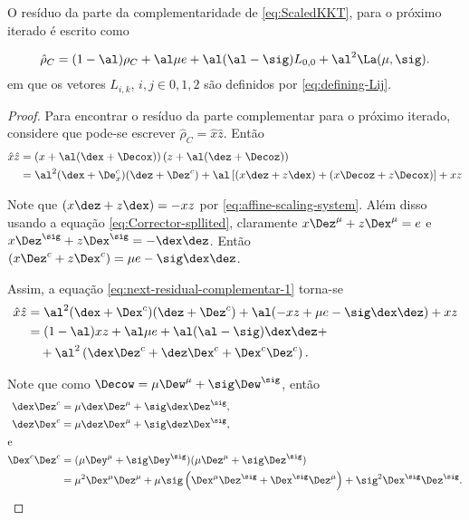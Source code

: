  
\begin{lema}\label{lemma:nonlinear-residual}
O resíduo da parte da complementaridade de  \eqref{eq:ScaledKKT}, para o próximo iterado é
escrito como

\begin{equation}
\label{eq:next-residual-complementar}
\hat{\rho}_C = (1-\al)\rho_C + \al\mu e+ \al(\al-\sig)L_{0,0} +
\al^2\La(\mu,\sig).
\end{equation}
em que os vetores $L_{i,k}$, $i,j \in {0,1,2}$ são definidos por
\eqref{eq:defining-Lij}.
\end{lema}

\begin{proof} 
Para encontrar o resíduo da parte complementar para o próximo iterado,
considere que pode-se escrever
 $\hat{\rho}_C  =
\hat{x}\hat{z}$. Então
\begin{align}
\hat{x}\hat{z} & = \left(x + \al(\dex + \Decox) \right)\left( z + \al(\dez + \Decoz
)\right) \notag \\
& = \al^2(\dex+\De^c_x)(\dez + \Dez^c) +  \al\left[  (x\dez+z\dex) +
(x\Decoz + z\Decox)\right] + xz \label{eq:next-residual-complementar-1}
\end{align}


Note que  $ (x\dez+z\dex) = -xz$ por \eqref{eq:affine-scaling-system}. Além
disso usando a equação \eqref{eq:Corrector-spllited}, claramente  $x\Dez^\mu +
z\Dex^\mu = e$ e $x\Dez^\sig + z\Dex^\sig = - \dex\dez$. Então $(x\Dez^c +
z\Dex^c) = \mu e - \sig\dex\dez$.
 
Assim, a equação \eqref{eq:next-residual-complementar-1} torna-se
\begin{subequations}
\begin{align}
\hat{x}\hat{z} & =  \al^2(\dex + \Dex^c)(\dez + \Dez^c) + \al (-xz + \mu   e
- \sig\dex\dez) + xz \notag\\
& = (1-\al) xz + \al\mu e +
\al(\al-\sig)\dex\dez    +
\label{eq:next-residual-complementar-2a} \\
& \quad + \al^2\left(\dex\Dez^c + \dez\Dex^c + \Dex^c\Dez^c\right).
\label{eq:next-residual-complementar-2b}
\end{align}
\end{subequations}

Note que como $\Decow = \mu\Dew^\mu + \sig\Dew^\sig$, então
\begin{align*}
\dex\Dez^c &=  \mu\dex\Dez^\mu + \sig\dex\Dez^\sig,\\
\dez\Dex^c &=  \mu\dez\Dex^\mu + \sig\dez\Dex^\sig,\\
\intertext{e}
\Dex^c\Dez^c& =   (\mu\Dey^\mu + \sig\Dey^\sig) (\mu\Dez^\mu
			+ \sig\Dez^\sig) \\ 
			& = \mu^2\Dex^\mu\Dez^\mu + \mu\sig \left(\Dex^\mu\Dez^\sig +
			\Dex^\sig\Dez^\mu \right) + \sig^2\Dex^\sig\Dez^\sig.
\end{align*}


\end{proof}
